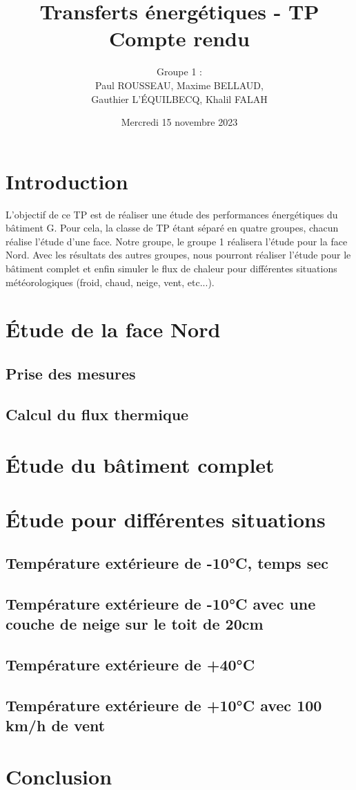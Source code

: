 \documentclass[12pt, a4paper]{article}
\title{Transferts énergétiques - TP \\
Compte rendu}
\author{Groupe 1 : \\
Paul ROUSSEAU, Maxime BELLAUD, \\
Gauthier L'ÉQUILBECQ, Khalil FALAH}
\date{Mercredi 15 novembre 2023}
\begin{document}
\maketitle

\tableofcontents

\section{Introduction}

L'objectif de ce TP est de réaliser une étude des performances énergétiques du bâtiment G. Pour cela, la classe de TP étant séparé en quatre groupes, chacun réalise l'étude d'une face. Notre groupe, le groupe 1 réalisera l'étude pour la face Nord. Avec les résultats des autres groupes, nous pourront réaliser l'étude pour le bâtiment complet et enfin simuler le flux de chaleur pour différentes situations météorologiques (froid, chaud, neige, vent, etc...).

\section{Étude de la face Nord}

\subsection{Prise des mesures}

\subsection{Calcul du flux thermique}

\section{Étude du bâtiment complet}

\section{Étude pour différentes situations}
\subsection{Température extérieure de -10°C, temps sec}

\subsection{Température extérieure de -10°C avec une couche de neige sur le toit de 20cm}

\subsection{Température extérieure de +40°C}

\subsection{Température extérieure de +10°C avec 100 km/h de vent}

\section{Conclusion}
\end{document}
